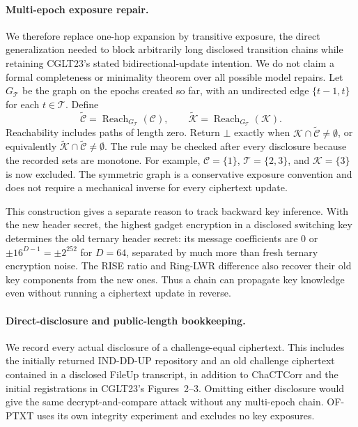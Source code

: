 \paragraph{Multi-epoch exposure repair.}
We therefore replace one-hop expansion by transitive exposure, the direct generalization needed to block arbitrarily long disclosed transition chains while retaining CGLT23's stated bidirectional-update intention. We do not claim a formal completeness or minimality theorem over all possible model repairs. Let $G_{\mathcal T}$ be the graph on the epochs created so far, with an undirected edge $\{t-1,t\}$ for each $t\in\mathcal T$. Define
\[
\widetilde{\mathcal C}=\operatorname{Reach}_{G_{\mathcal T}}(\mathcal C),\qquad
\widetilde{\mathcal K}=\operatorname{Reach}_{G_{\mathcal T}}(\mathcal K).
\]
Reachability includes paths of length zero. Return $\bot$ exactly when $\mathcal K\cap\widetilde{\mathcal C}\ne\emptyset$, or equivalently $\widetilde{\mathcal K}\cap\widetilde{\mathcal C}\ne\emptyset$. The rule may be checked after every disclosure because the recorded sets are monotone. For example, $\mathcal C=\{1\}$, $\mathcal T=\{2,3\}$, and $\mathcal K=\{3\}$ is now excluded. The symmetric graph is a conservative exposure convention and does not require a mechanical inverse for every ciphertext update.

This construction gives a separate reason to track backward key inference. With the new header secret, the highest gadget encryption in a disclosed switching key determines the old ternary header secret: its message coefficients are $0$ or $\pm16^{D-1}=\pm2^{252}$ for $D=64$, separated by much more than fresh ternary encryption noise. The RISE ratio and Ring-LWR difference also recover their old key components from the new ones. Thus a chain can propagate key knowledge even without running a ciphertext update in reverse.

\paragraph{Direct-disclosure and public-length bookkeeping.}
We record every actual disclosure of a challenge-equal ciphertext. This includes the initially returned IND-DD-UP repository and an old challenge ciphertext contained in a disclosed FileUp transcript, in addition to ChaCTCorr and the initial registrations in CGLT23's Figures~2--3. Omitting either disclosure would give the same decrypt-and-compare attack without any multi-epoch chain. OF-PTXT uses its own integrity experiment and excludes no key exposures.

